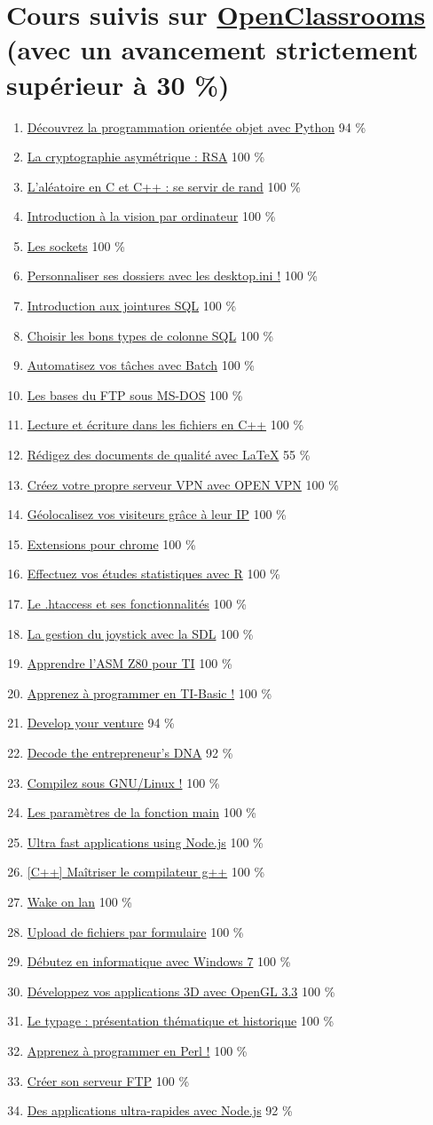 \documentclass{article}
\newcommand{\lesson}[3]
{
	\item \href{https://openclassrooms.com/courses/#1}{#2} #3 \%
}
\begin{document}

	\section{Cours suivis sur \href{https://openclassrooms.com/fr/membres/benjaminloison}{OpenClassrooms} (avec un avancement strictement supérieur à 30 \%)}

	\begin{enumerate}

		\lesson{4302126}{Découvrez la programmation orientée objet avec Python}{94}
		\lesson{1362801}{La cryptographie asymétrique : RSA}{100}
		\lesson{1067141}{L'aléatoire en C et C++ : se servir de rand}{100}
		\lesson{1490316}{Introduction à la vision par ordinateur}{100}
		\lesson{1160706}{Les sockets}{100}
		\lesson{1104776}{Personnaliser ses dossiers avec les desktop.ini !}{100}
		\lesson{1208071}{Introduction aux jointures SQL}{100}
		\lesson{1225826}{Choisir les bons types de colonne SQL}{100}
		\lesson{1945566}{Automatisez vos tâches avec Batch}{100}
		\lesson{1063476}{Les bases du FTP sous MS-DOS}{100}
		\lesson{1133001}{Lecture et écriture dans les fichiers en C++}{100}
		\lesson{1617396}{Rédigez des documents de qualité avec LaTeX}{55}
		\lesson{2460986}{Créez votre propre serveur VPN avec OPEN VPN}{100}
		\lesson{1229396}{Géolocalisez vos visiteurs grâce à leur IP}{100}
		\lesson{1408416}{Extensions pour chrome}{100}
		\lesson{1393696}{Effectuez vos études statistiques avec R}{100}
		\lesson{1093276}{Le .htaccess et ses fonctionnalités}{100}
		\lesson{373115}{La gestion du joystick avec la SDL}{100}
		\lesson{533864}{Apprendre l'ASM Z80 pour TI}{100}
		\lesson{960281}{Apprenez à programmer en TI-Basic !}{100}
		\lesson{2976551}{Develop your venture}{94}
		\lesson{2709621}{Decode the entrepreneur's DNA}{92}
		\lesson{1130196}{Compilez sous GNU/Linux !}{100}
		\lesson{1090881}{Les paramètres de la fonction main}{100}
		\lesson{2504541}{Ultra fast applications using Node.js}{100}
		\lesson{1262861}{[C++] Maîtriser le compilateur g++}{100}
		\lesson{1159951}{Wake on lan}{100}
		\lesson{1085676}{Upload de fichiers par formulaire}{100}
		\lesson{709545}{Débutez en informatique avec Windows 7}{100}
		\lesson{966823}{Développez vos applications 3D avec OpenGL 3.3}{100}
		\lesson{1129721}{Le typage : présentation thématique et historique}{100}
		\lesson{1601801}{Apprenez à programmer en Perl !}{100}
		\lesson{1256396}{Créer son serveur FTP}{100}
		\lesson{1056721}{Des applications ultra-rapides avec Node.js}{92}

\end{enumerate}
\end{document}
